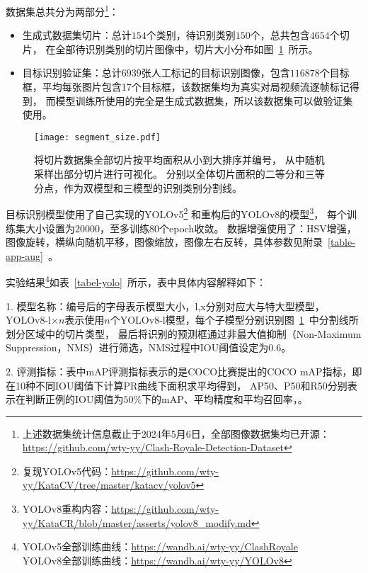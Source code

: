 

数据集总共分为两部分\footnote{上述数据集统计信息截止于2024年5月6日，全部图像数据集均已开源：\\
\url{https://github.com/wty-yy/Clash-Royale-Detection-Dataset}\hfill}：
\begin{itemize}
  \item 生成式数据集切片：总计$154$个类别，待识别类别$150$个，总共包含$4654$个切片，
  在全部待识别类别的切片图像中，切片大小分布如图~\ref{fig-segment}~所示。
  \item 目标识别验证集：总计$6939$张人工标记的目标识别图像，包含$116878$个目标框，平均每张图片包含17个目标框，该数据集均为真实对局视频流逐帧标记得到，
  而模型训练所使用的完全是生成式数据集，所以该数据集可以做验证集使用。
\end{itemize}

\begin{figure}[htbp]
  \centering
  \texttt{[image: segment\_size.pdf]}
  \caption{将切片数据集全部切片按平均面积从小到大排序并编号，
  从中随机采样出部分切片进行可视化。
  分别以全体切片面积的二等分和三等分点，作为双模型和三模型的识别类别分割线。
  }
  \label{fig-segment}
\end{figure}

目标识别模型使用了自己实现的YOLOv5\footnote{复现YOLOv5代码：\url{https://github.com/wty-yy/KataCV/tree/master/katacv/yolov5}\hfill}
和重构后的YOLOv8的模型\footnote{YOLOv8重构内容：\url{https://github.com/wty-yy/KataCR/blob/master/asserts/yolov8_modify.md}\hfill}，
每个训练集大小设置为$20000$，至多训练$80$个epoch收敛。
数据增强使用了：HSV增强，图像旋转，横纵向随机平移，图像缩放，图像左右反转，具体参数见附录~\ref{table-app-aug}~。

实验结果\footnote{YOLOv5全部训练曲线：\url{https://wandb.ai/wty-yy/ClashRoyale}\\\makebox[2.4ex][]{}YOLOv8全部训练曲线：\url{https://wandb.ai/wty-yy/YOLOv8}}如表~\ref{tabel-yolo}~所示，表中具体内容解释如下：

1. 模型名称：编号后的字母表示模型大小，l,x分别对应大与特大型模型，
YOLOv8-l$\times n$表示使用$n$个YOLOv8-l模型，每个子模型分别识别图~\ref{fig-segment}~中分割线所划分区域中的切片类型，
最后将识别的预测框通过非最大值抑制（Non-Maximum Suppression，NMS）进行筛选，NMS过程中IOU阈值设定为0.6。

2. 评测指标：表中mAP评测指标表示的是COCO比赛提出的COCO mAP指标，即在10种不同IOU阈值下计算PR曲线下面积求平均得到，
AP50、P50和R50分别表示在判断正例的IOU阈值为$50\%$下的mAP、平均精度和平均召回率，。

